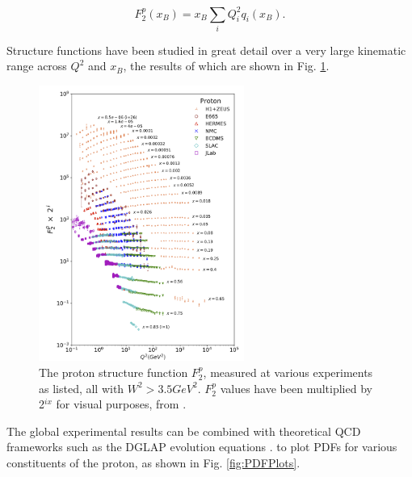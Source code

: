         \begin{equation}\label{eq:PDFs}
            F_2^p(x_B) = x_B \sum_i Q^2_i q_i(x_B).
        \end{equation}
        
        Structure functions have been studied in great detail over a very large kinematic range across $Q^2$ and $x_B$, the results of which are shown in Fig. \ref{fig:HERA}.
    
        
        \begin{figure}[H]
            \centering
            \includegraphics[width=0.6\textwidth]{Chapters/Ch1-Intro/Ch1-Sec1-Background/pics/inelastic-ep/protF2.png}
            \caption[Proton Structure Function $F^p_2$]{The proton structure function $F^p_2$, measured at various experiments as listed, all with $W^2>3.5 GeV^2$. $F^p_2$ values have been multiplied by 2$^{ix}$ for visual purposes, from \parencite{Zyla2020ReviewPhysics}.}
            \label{fig:HERA}
        \end{figure}

        The global experimental results can be combined with theoretical QCD frameworks such as the DGLAP evolution equations \parencite{Altarelli1977AsymptoticLanguage}. to plot PDFs for various constituents of the proton, as shown in Fig. \ref{fig:PDFPlots}. 
        
